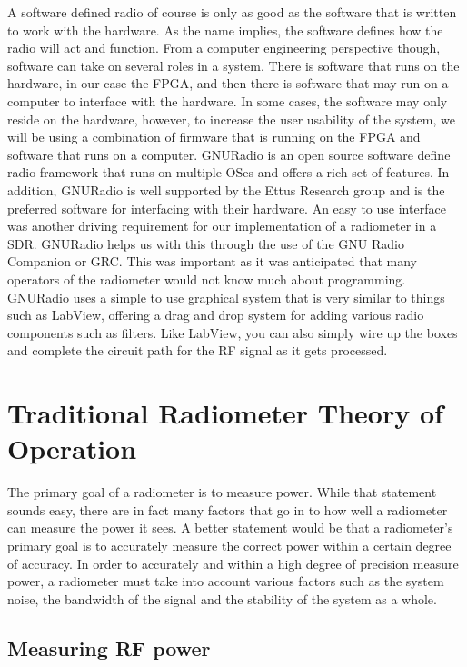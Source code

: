 A software defined radio of course is only as good as the software that is written to work with the hardware.  As the name implies, the software defines how the radio will act and function.  From a computer engineering perspective though, software can take on several roles in a system.  There is software that runs on the hardware, in our case the FPGA, and then there is software that may run on a computer to interface with the hardware.  In some cases, the software may only reside on the hardware, however, to increase the user usability of the system, we will be using a combination of firmware that is running on the FPGA and software that runs on a computer.  GNURadio is an open source software define radio framework that runs on multiple OSes and offers a rich set of features.  In addition, GNURadio is well supported by the Ettus Research group and is the preferred software for interfacing with their hardware.  An easy to use interface was another driving requirement for our implementation of a radiometer in a SDR.  GNURadio helps us with this through the use of the GNU Radio Companion or GRC.  This was important as it was anticipated that many operators of the radiometer would not know much about programming.  GNURadio uses a simple to use graphical system that is very similar to things such as LabView, offering a drag and drop system for adding various radio components such as filters.  Like LabView, you can also simply wire up the boxes and complete the circuit path for the RF signal as it gets processed.

\section{Traditional Radiometer Theory of Operation}

The primary goal of a radiometer is to measure power.  While that statement sounds easy, there are in fact many factors that go in to how well a radiometer can measure the power it sees.  A better statement would be that a radiometer's primary goal is to accurately measure the correct power within a certain degree of accuracy.  In order to accurately and within a high degree of precision measure power, a radiometer must take into account various factors such as the system noise, the bandwidth of the signal and the stability of the system as a whole.  

\subsection{Measuring RF power}

